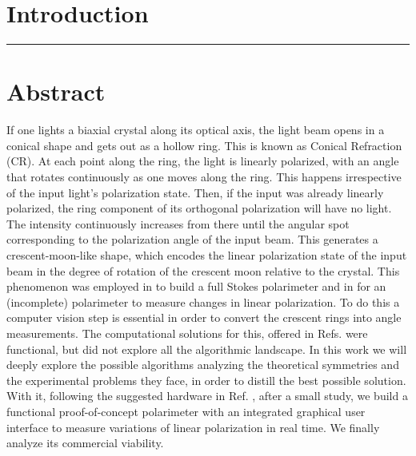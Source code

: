 \documentclass[11pt, a4paper, twoside]{article} %
\newenvironment{dedication}
  {\clearpage           %
   \thispagestyle{empty}%
   \vspace*{\stretch{1}}%
   \itshape             %
   \raggedleft          %
  }
  {\par %
   \vspace{\stretch{3}} %
   \clearpage           %
  }
\begin{document}
\newpage
\clearpage
\newpage
\clearpage
\maketitle
\vspace{-0.3cm}
\setlength{\cftbeforesecskip}{0.4cm}
\setlength{\cftbeforesubsecskip}{0.4cm}
\setlength{\cftbeforesubsubsecskip}{0.25cm}

\tableofcontents
\clearpage
\newpage
\clearpage
\newpage
{}
\setcounter{page}{1}
\vspace{-0.3 cm}

\pagestyle{fancy}

\section*{\centering \huge{Introduction}\vspace{-0.35cm}}
\noindent\rule{\textwidth}{0.4pt}
\vspace{-0.8cm}
\section*{Abstract\vspace{-0.1cm}}
If one lights a biaxial crystal along its optical axis, the light beam opens in a conical shape and gets out as a hollow ring. This is known as Conical Refraction (CR). At each point along the ring, the light is linearly polarized, with an angle that rotates continuously as one moves along the ring. This happens irrespective of the input light's polarization state. Then, if the input was already linearly polarized, the ring component of its orthogonal polarization will have no light. The intensity continuously increases from there until the angular spot corresponding to the polarization angle of the input beam. This generates a crescent-moon-like shape, which encodes the linear polarization state of the input beam in the degree of rotation of the crescent moon relative to the crystal. This phenomenon was employed in \cite{Stokes1, Stokes2} to build a full Stokes polarimeter and in \cite{incomplete} for an (incomplete) polarimeter to measure changes in linear polarization. To do this a computer vision step is essential in order to convert the crescent rings into angle measurements. The computational solutions for this, offered in Refs. \cite{incomplete, Stokes1, Stokes2} were functional, but did not explore all the algorithmic landscape. In this work we will deeply explore the possible algorithms analyzing the theoretical symmetries and the experimental problems they face, in order to distill the best possible solution. With it, following the suggested hardware in Ref. \cite{incomplete}, after a small study, we build a functional proof-of-concept polarimeter with an integrated graphical user interface to measure variations of linear polarization in real time. We finally analyze its commercial viability.
\end{document}
